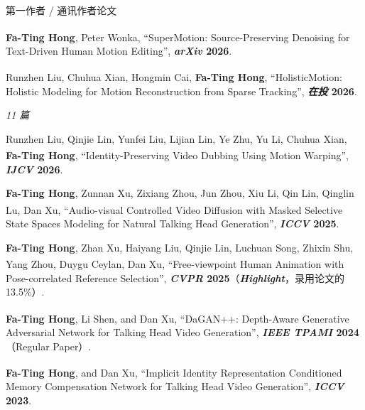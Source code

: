 \documentclass{resume}
\newcommand{\pubgroup}[2]{\par\needspace{6\baselineskip}\vspace{4pt}\noindent{\bfseries\scshape #1}\hfill{\small\itshape\color{pubgray}#2}\par\vspace{-1pt}}
\newcommand{\pubtopic}[2]{\par\needspace{3\baselineskip}\vspace{2pt}\noindent\hspace{8pt}{\color{#1}\rule[-1pt]{2.5pt}{9pt}}\hspace{5pt}{\small\bfseries\color{#1}#2}\par\vspace{1pt}}
\begin{document}
\begin{rSection}{第一作者 / 通讯作者论文}
\begin{enumerate}[label={\color{topicMO}[R\arabic*]}, start=7, leftmargin=26pt, labelsep=5pt, itemsep=0pt, parsep=0pt, topsep=0pt]
    \item \textbf{Fa-Ting Hong}, Peter Wonka{\textsuperscript{\Letter}},
    ``SuperMotion: Source-Preserving Denoising for Text-Driven Human Motion Editing'', \textbf{\textit{arXiv} 2026}.

    \item Runzhen Liu, Chuhua Xian, Hongmin Cai, \textbf{Fa-Ting Hong}{\textsuperscript{\Letter}},
    ``HolisticMotion: Holistic Modeling for Motion Reconstruction from Sparse Tracking'', \textbf{\textit{在投} 2026}.

\end{enumerate}

\pubgroup{已发表论文}{11 篇}
\pubtopic{topicVG}{以人为中心的视频与视觉理解 / 生成}
\begin{enumerate}[label={\color{topicVG}[P\arabic*]}, start=1, leftmargin=26pt, labelsep=5pt, itemsep=0pt, parsep=0pt, topsep=0pt]
    \item Runzhen Liu, Qinjie Lin, Yunfei Liu, Lijian Lin, Ye Zhu, Yu Li, Chuhua Xian, \textbf{Fa-Ting Hong}{\textsuperscript{\Letter}},
    ``Identity-Preserving Video Dubbing Using Motion Warping'', \textbf{\textit{IJCV} 2026}.

    \item \textbf{Fa-Ting Hong}, Zunnan Xu, Zixiang Zhou, Jun Zhou, Xiu Li, Qin Lin, Qinglin Lu, Dan Xu{\textsuperscript{\Letter}},
    ``Audio-visual Controlled Video Diffusion with Masked Selective State Spaces Modeling for Natural Talking Head Generation'', \textbf{\textit{ICCV} 2025}.

    \item \textbf{Fa-Ting Hong}, Zhan Xu, Haiyang Liu, Qinjie Lin, Luchuan Song, Zhixin Shu, Yang Zhou, Duygu Ceylan, Dan Xu{\textsuperscript{\Letter}},
    ``Free-viewpoint Human Animation with Pose-correlated Reference Selection'', \textbf{\textit{CVPR} 2025}（\textbf{\textit{Highlight}}，录用论文的 13.5\%）.

    \item \textbf{Fa-Ting Hong}, Li Shen, and Dan Xu{\textsuperscript{\Letter}},
    ``DaGAN++: Depth-Aware Generative Adversarial Network for Talking Head Video Generation'', \textbf{\textit{IEEE TPAMI} 2024}（Regular Paper）.

    \item \textbf{Fa-Ting Hong}, and Dan Xu{\textsuperscript{\Letter}},
    ``Implicit Identity Representation Conditioned Memory Compensation Network for Talking Head Video Generation'', \textbf{\textit{ICCV} 2023}.


\end{enumerate}
\end{rSection}
\end{document}
